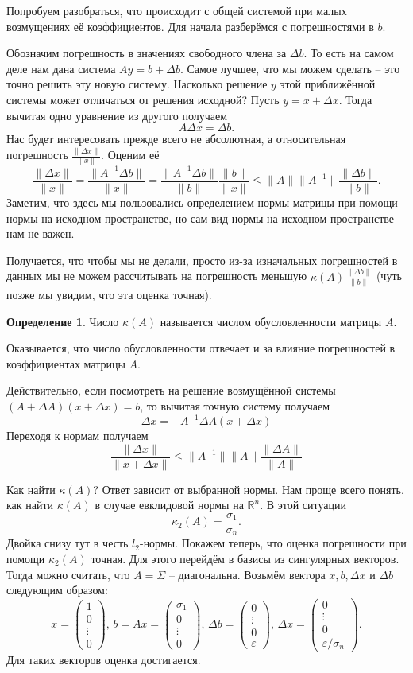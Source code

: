 \documentclass[12pt,a4paper,oneside]{book}
\theoremstyle{definition}
\newtheorem*{defn}{\color{yellow!30!red} Определение}
\renewcommand{\leq}{\leqslant}
\newcommand{\R}{\mathbb R}
\def\eps{\varepsilon}
\def\dfn{\begin{defn}}
\def\edfn{\end{defn}}
\def\pmat{\begin{pmatrix}}
\def\epmat{\end{pmatrix}}
\begin{document}
Попробуем разобраться, что происходит с общей системой при малых возмущениях её коэффициентов. Для начала разберёмся с погрешностями в $b$.

Обозначим погрешность в значениях свободного члена за $\Delta b$. То есть на самом деле нам дана система $Ay=b+\Delta b$. Самое лучшее, что мы можем сделать -- это точно решить эту новую систему. Насколько решение $y$ этой приближённой системы может отличаться от решения исходной? Пусть $y=x+\Delta x$. Тогда вычитая одно уравнение из другого получаем
$$A \Delta x= \Delta b.$$
Нас будет интересовать прежде всего не абсолютная, а относительная погрешность $\frac{\|\Delta x\|}{\|x\|}$. Оценим её
$$\frac{\|\Delta x\|}{\|x\|}=\frac{\|A^{-1} \Delta b \|}{\|x\|}=\frac{\|A^{-1} \Delta b \|}{\|b\|} \frac{\|b\|}{\|x\|} \leq \|A\| \|A^{-1}\| \frac{\|\Delta b\|}{\|b\|}.$$
Заметим, что здесь мы пользовались определением нормы матрицы при помощи нормы на исходном пространстве, но сам вид нормы на исходном пространстве нам не важен.

Получается, что чтобы мы не делали, просто из-за изначальных погрешностей в данных мы не можем рассчитывать  на погрешность меньшую $\kappa(A)\frac{\|\Delta b\|}{\|b\|}$
(чуть позже мы увидим, что эта оценка точная). 

\dfn Число $\kappa(A)$ называется числом обусловленности матрицы $A$.
\edfn

Оказывается, что число обусловленности отвечает и за влияние погрешностей в коэффициентах матрицы $A$.

Действительно, если посмотреть на решение возмущённой системы $(A+\Delta A)(x+\Delta x)=b$, то вычитая точную систему получаем
$$\Delta x= -A^{-1}\Delta A (x+\Delta x)$$
Переходя к нормам получаем
$$\frac{\|\Delta x\|}{\|x+\Delta x\|}\leq \|A^{-1}\| \|A\| \frac{\|\Delta A\|}{\|A\|}$$

Как найти $\kappa(A)$? Ответ зависит от выбранной нормы. Нам проще всего понять, как найти $\kappa(A)$ в случае евклидовой нормы на $\R^n$. В этой ситуации $$\kappa_2(A)=\frac{\sigma_1}{\sigma_n}.$$
Двойка снизу тут в честь $l_2$-нормы.
Покажем теперь, что оценка погрешности при помощи $\kappa_2(A)$ точная. Для этого перейдём в базисы из сингулярных векторов. Тогда можно считать, что $A=\Sigma$ -- диагональна. Возьмём вектора $x,b,\Delta x$ и $\Delta b$ следующим образом:
$$x=\pmat 1 \\ 0\\ \vdots \\ 0 \epmat,\, b=Ax=\pmat \sigma_1 \\ 0\\ \vdots \\ 0 \epmat, \, \Delta b = \pmat 0 \\ \vdots \\ 0 \\ \eps \epmat, \, \Delta x=  \pmat 0 \\  \vdots \\ 0 \\ \eps/\sigma_n\epmat.$$
Для таких векторов оценка достигается.
\end{document}
